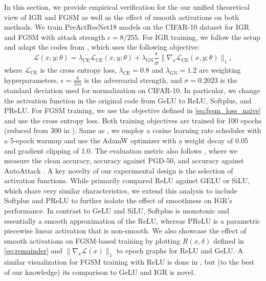\documentclass{article}
\begin{document}
In this section, we provide empirical verification for the our unified theoretical view of IGR and FGSM as well as the effect of smooth activations on both methods. We train PreActResNet18 models on the CIFAR-10 dataset for IGR and FGSM with attack strength $\epsilon=8/255$. For IGR training, we follow the setup and adapt the codes from \cite{rodríguezmuñoz2024characterizingmodelrobustnessnatural}, which uses the following objective:
\[
  \mathcal{L}(x, y; \theta) = \lambda_{\text{CE}} \mathcal{L}_{\text{CE}}(x, y; \theta) + \lambda_{\text{GN}}\frac{\epsilon}{\sigma} \|\nabla_x \mathcal{L}_{\text{CE}}(x, y; \theta)\|_1,
\]
where $\mathcal{L}_{\text{CE}}$ is the cross entropy loss, $\lambda_{\text{CE}} = 0.8$ and $\lambda_{\text{GN}} = 1.2$ are weighting hyperparameters, $\epsilon = \frac{8}{255}$ is the adversarial strength, and $\sigma = 0.2023$ is the standard deviation used for normalization on CIFAR-10. In particular, we change the activation function in the original code from GeLU to ReLU, Softplus, and PReLU. For FGSM training, we use the objective defined in \eqref{eq:fgsm_loss_naive} and use the cross entropy loss. Both training objectives are trained for 100 epochs (reduced from 300 in \cite{rodríguezmuñoz2024characterizingmodelrobustnessnatural}). Same as \cite{rodríguezmuñoz2024characterizingmodelrobustnessnatural}, we employ a cosine learning rate scheduler \cite{loshchilov2017sgdrstochasticgradientdescent} with a 5-epoch warmup and use the AdamW optimizer \cite{loshchilov2019decoupledweightdecayregularization} with a weight decay of 0.05 and gradient clipping of 1.0. The evaluation metric also follows \cite{rodríguezmuñoz2024characterizingmodelrobustnessnatural}, where we measure the clean accuracy, accuracy against PGD-50, and accuracy against AutoAttack \cite{croce2020reliableevaluationadversarialrobustness}. A key novelty of our experimental design is the selection of activation functions. While \cite{rodríguezmuñoz2024characterizingmodelrobustnessnatural} primarily compared ReLU against GELU or SiLU, which share very similar characteristics, we extend this analysis to include Softplus and PReLU to further isolate the effect of smoothness on IGR's performance. In contrast to GeLU and SiLU, Softplus is monotonic and essentially a smooth approximation of the ReLU, whereas PReLU is a parametric piecewise linear activation that is non-smooth. We also showcase the effect of smooth activations on FGSM-based training by plotting $R(x, \delta)$ defined in \eqref{eq:remainder} and $\|\nabla_x \mathcal{L}(x)\|_1$ to epoch graphs for ReLU and GeLU. A similar visualization for FGSM training with ReLU is done in \cite{rocamora2024efficientlocallinearityregularization}, but (to the best of our knowledge) its comparison to GeLU and IGR is novel.
\end{document}
